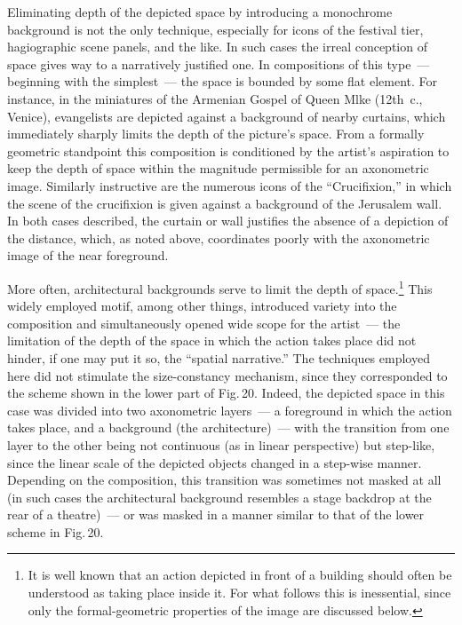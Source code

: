 Eliminating depth of the depicted space by introducing a monochrome background is
not the only technique, especially for icons of the festival tier, hagiographic scene
panels, and the like.  In such cases the irreal conception of space gives way to a
narratively justified one.  In compositions of this type~--- beginning with the
simplest~--- the space is bounded by some flat element.  For instance, in the miniatures
of the Armenian Gospel of Queen Mlke (12th~c., Venice), evangelists are depicted
against a background of nearby curtains, which immediately sharply limits the depth of
the picture's space.  From a formally geometric standpoint this composition is
conditioned by the artist's aspiration to keep the depth of space within the magnitude
permissible for an axonometric image.  Similarly instructive are the numerous icons of
the ``Crucifixion,'' in which the scene of the crucifixion is given against a background
of the Jerusalem wall.  In both cases described, the curtain or wall justifies the absence
of a depiction of the distance, which, as noted above, coordinates poorly with the
axonometric image of the near foreground.


More often, architectural backgrounds serve to limit the depth of space.\footnote{%
  It is well known that an action depicted in front of a building should often be
  understood as taking place inside it.  For what follows this is inessential, since only
  the formal-geometric properties of the image are discussed below.}
This widely employed motif, among other things, introduced variety into the composition
and simultaneously opened wide scope for the artist~--- the limitation of the depth of
the space in which the action takes place did not hinder, if one may put it so, the
``spatial narrative.''  The techniques employed here did not stimulate the size-constancy
mechanism, since they corresponded to the scheme shown in the lower part of Fig.\,20.
Indeed, the depicted space in this case was divided into two axonometric layers~---
a foreground in which the action takes place, and a background (the architecture)~---
with the transition from one layer to the other being not continuous (as in linear
perspective) but step-like, since the linear scale of the depicted objects changed in a
step-wise manner.  Depending on the composition, this transition was sometimes not
masked at all (in such cases the architectural background resembles a stage backdrop at
the rear of a theatre)~--- or was masked in a manner similar to that of the lower scheme
in Fig.\,20.

